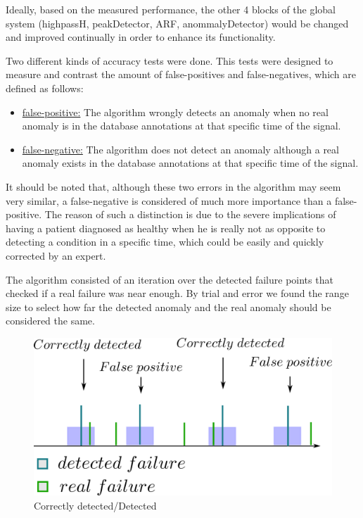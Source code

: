 \documentclass[conference]{IEEEtran}
\begin{document}
Ideally, based on the measured performance, the other 4 blocks of the global system (highpassH, peakDetector, ARF, anommalyDetector) would be changed and improved continually in order to enhance its functionality.\par

Two different kinds of accuracy tests were done. This tests were designed to measure and contrast the amount of false-positives and false-negatives, which are defined as follows:\par
\begin{itemize}
\item \underline{false-positive:} The algorithm wrongly detects an anomaly when no real anomaly is in the database annotations at that specific time of the signal.
\item \underline{false-negative:} The algorithm does not detect an anomaly although a real anomaly exists in the database annotations at that specific time of the signal.
\end{itemize}

It should be noted that, although these two errors in the algorithm may seem very similar, a false-negative is considered of much more importance than a false-positive. The reason of such a distinction is due to the severe implications of having a patient diagnosed as healthy when he is really not as opposite to detecting a condition in a specific time, which could be easily and quickly corrected by an expert.\par

The algorithm consisted of an iteration over the detected failure points that checked if a real failure was near enough. By trial and error we found the range size to select how far the detected anomaly and the real anomaly should be considered the same.  
\begin{figure}[H]
\centerline{\includegraphics[scale=0.8]{imagenes/comparisonAlgo.png}}
\caption{Correctly detected/Detected}
\label{fig}
\end{figure}
\end{document}
